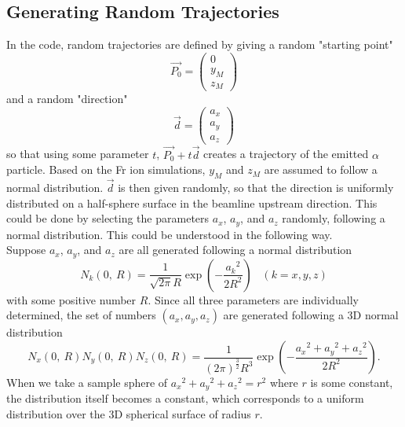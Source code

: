 \documentclass{article}
\begin{document}
\subsection{Generating Random Trajectories}
In the code, random trajectories are defined by giving a random "starting point" 
$$
\vec{P_0} = \left(
\begin{array}{c}
	0 \\
	y_M \\
	z_M
\end{array} \right)
$$
and a random "direction" 
$$
\vec{d} = \left(
\begin{array}{c}
	a_x \\
	a_y \\
	a_z
\end{array} \right)
$$
so that using some parameter $t$, $\vec{P_0} + t\vec{d}$ creates a trajectory of the emitted $\alpha$ particle. Based on the Fr ion simulations, $y_M$ and $z_M$ are assumed to follow a normal distribution. $\vec{d}$ is then given randomly, so that the direction is uniformly distributed on a half-sphere surface in the beamline upstream direction. This could be done by selecting the parameters $a_x$, $a_y$, and $a_z$ randomly, following a normal distribution\cite{Muller1959}. This could be understood in the following way. \\

Suppose $a_x$, $a_y$, and $a_z$ are all generated following a normal distribution
$$
N_k(0,\ R) = \frac{1}{\sqrt{2\pi}R}\exp{\left(-\frac{{a_k}^2}{2R^2}\right)}\, \, \, \, \, (k = x, y, z)
$$
with some positive number $R$. Since all three parameters are individually determined, the set of numbers $(a_x, a_y, a_z)$ are generated following a 3D normal distribution
$$
N_x(0,\ R) N_y(0,\ R) N_z(0,\ R) = \frac{1}{(2\pi)^\frac{3}{2} R^3} \exp{\left(-\frac{{a_x}^2 + {a_y}^2 + {a_z}^2}{2R^2}\right)}.
$$
When we take a sample sphere of ${a_x}^2 + {a_y}^2 + {a_z}^2 = r^2$ where $r$ is some constant, the distribution itself becomes a constant, which corresponds to a uniform distribution over the 3D spherical surface of radius $r$. \\
\end{document}

